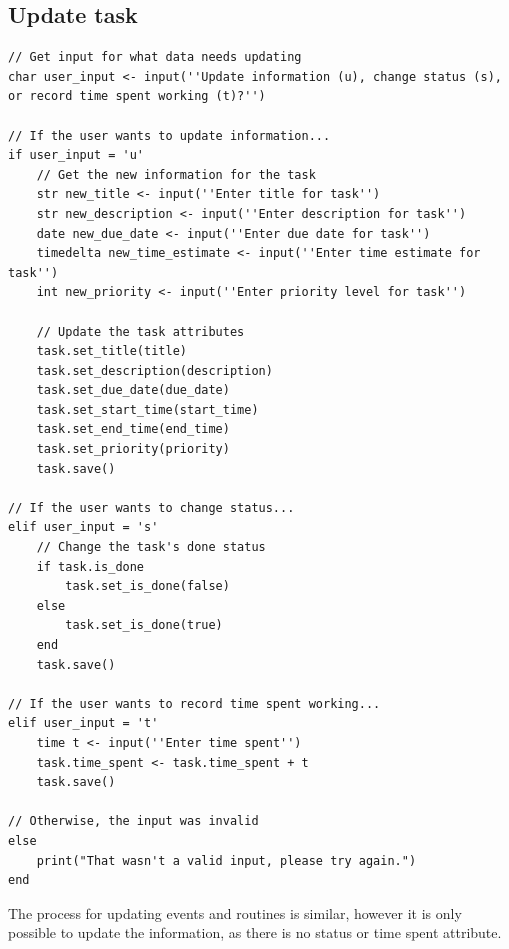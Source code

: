\documentclass{article}
\begin{document}
\subsection{Update task}
\begin{lstlisting}[breaklines]
// Get input for what data needs updating
char user_input <- input(''Update information (u), change status (s), or record time spent working (t)?'')

// If the user wants to update information...
if user_input = 'u'
    // Get the new information for the task
    str new_title <- input(''Enter title for task'')
    str new_description <- input(''Enter description for task'')
    date new_due_date <- input(''Enter due date for task'')
    timedelta new_time_estimate <- input(''Enter time estimate for task'')
    int new_priority <- input(''Enter priority level for task'')

    // Update the task attributes
    task.set_title(title)
    task.set_description(description)
    task.set_due_date(due_date)
    task.set_start_time(start_time)
    task.set_end_time(end_time)
    task.set_priority(priority)
    task.save()

// If the user wants to change status...
elif user_input = 's'
    // Change the task's done status
    if task.is_done
        task.set_is_done(false)
    else
        task.set_is_done(true)
    end
    task.save()

// If the user wants to record time spent working...
elif user_input = 't'
    time t <- input(''Enter time spent'')
    task.time_spent <- task.time_spent + t
    task.save()

// Otherwise, the input was invalid
else
    print("That wasn't a valid input, please try again.")
end
\end{lstlisting}

The process for updating events and routines is similar,
however it is only possible to update the information,
as there is no status or time spent attribute.
\end{document}

